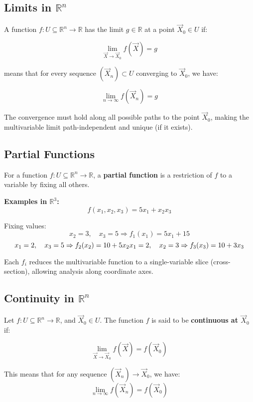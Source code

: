 \subsection{Limits in \( \mathbb{R}^n \)}

A function \( f : U \subseteq \mathbb{R}^n \to \mathbb{R} \) has the limit \( g \in \mathbb{R} \) at a point \( \vec{X}_0 \in U \) if:

\[
\lim_{\vec{X} \to \vec{X}_0} f(\vec{X}) = g
\]

means that for every sequence \( (\vec{X}_n) \subset U \) converging to \( \vec{X}_0 \), we have:

\[
\lim_{n \to \infty} f(\vec{X}_n) = g
\]

The convergence must hold along all possible paths to the point \( \vec{X}_0 \), making the multivariable limit path-independent and unique (if it exists).


\subsection{Partial Functions}

For a function \( f: U \subseteq \mathbb{R}^n \to \mathbb{R} \), a \textbf{partial function} is a restriction of \( f \) to a variable by fixing all others.

\textbf{Examples in \( \mathbb{R}^3 \):}
\[
f(x_1, x_2, x_3) = 5x_1 + x_2 x_3
\]

Fixing values:
\[
x_2 = 3, \quad x_3 = 5 \Rightarrow f_1(x_1) = 5x_1 + 15 
\]
\[
x_1 = 2, \quad x_3 = 5 \Rightarrow f_2(x_2) = 10 + 5x_2 \\
x_1 = 2, \quad x_2 = 3 \Rightarrow f_3(x_3) = 10 + 3x_3
\]

Each \( f_i \) reduces the multivariable function to a single-variable slice (cross-section), allowing analysis along coordinate axes.


\subsection{Continuity in \( \mathbb{R}^n \)}

Let \( f : U \subseteq \mathbb{R}^n \to \mathbb{R} \), and \( \vec{X}_0 \in U \). The function \( f \) is said to be \textbf{continuous at \( \vec{X}_0 \)} if:

\[
\lim_{\vec{X} \to \vec{X}_0} f(\vec{X}) = f(\vec{X}_0)
\]

This means that for any sequence \( (\vec{X}_n) \to \vec{X}_0 \), we have:
\[
\lim_{n \to \infty} f(\vec{X}_n) = f(\vec{X}_0)
\]

